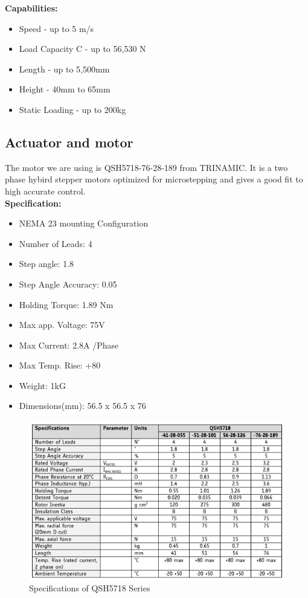 \documentclass[11pt,a4paper]{article}
\begin{document}
\textbf{Capabilities:}
\begin{itemize}
	\item Speed - up to 5 m/s
	\item Load Capacity C - up to 56,530 N
	\item Length - up to 5,500mm
	\item Height - 40mm to 65mm
	\item Static Loading - up to 200kg
\end{itemize}




\newpage
\subsection{Actuator and motor}
The motor we are using is QSH5718-76-28-189 from TRINAMIC. It is a two phase hybird stepper motors optimized for microstepping and gives a good fit to high accurate control.\\

\textbf{Specification:}
\begin{itemize}
	\item NEMA 23 mounting Configuration
	\item Number of Leads:	4
	\item Step angle:	1.8
	\item Step Angle Accuracy:	0.05
	\item Holding Torque:	1.89 Nm
	\item Max app. Voltage: 75V
	\item Max Current:	2.8A /Phase	
	\item Max Temp. Rise:	+80
	\item Weight:	1kG
	\item Dimensions(mm):	56.5 x 56.5 x 76
\end{itemize}
\begin{figure}[h!]
	\centering
	\includegraphics[scale=1]{img/qsh-serie.png}
	\caption{Specifications of QSH5718 Series}
	\label{fig:Specifications of QSH5718 Series}
\end{figure}
\end{document}
